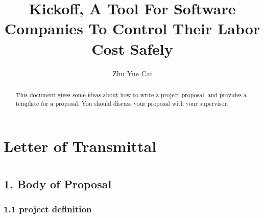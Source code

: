 \documentclass[11pt, a4paper, openright]{report}
\title{Kickoff, A Tool For Software Companies To Control Their Labor Cost Safely}
\author{Zhu Yue Cai}
\date{}
\begin{document}
\frontmatter


\begin{abstract}
	
  This document gives some ideas about how to write a project
  proposal, and provides a template for a proposal. You should discuss
  your proposal with your supervisor.
\end{abstract}


\maketitle
\tableofcontents %
\setcounter{page}{2} %





\mainmatter

\chapter*{Letter of Transmittal}
\setcounter{page}{3}

\chapter*{}
\section* {1. Body of Proposal}

\subsection*{1.1 project definition}
\end{document}
